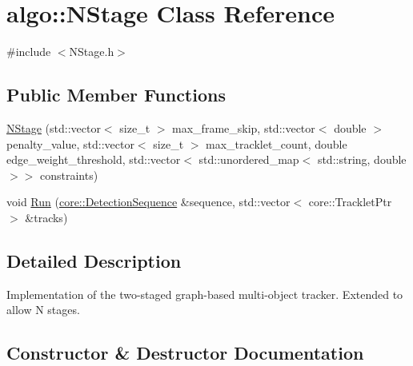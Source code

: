 \hypertarget{classalgo_1_1NStage}{}\section{algo\+:\+:N\+Stage Class Reference}
\label{classalgo_1_1NStage}


{\ttfamily \#include $<$N\+Stage.\+h$>$}

\subsection*{Public Member Functions}
\begin{DoxyCompactItemize}
\item 
\hyperlink{classalgo_1_1NStage_a3fd89ae32d8723b4fcd650be280a9c7c}{N\+Stage} (std\+::vector$<$ size\+\_\+t $>$ max\+\_\+frame\+\_\+skip, std\+::vector$<$ double $>$ penalty\+\_\+value, std\+::vector$<$ size\+\_\+t $>$ max\+\_\+tracklet\+\_\+count, double edge\+\_\+weight\+\_\+threshold, std\+::vector$<$ std\+::unordered\+\_\+map$<$ std\+::string, double $>$$>$ constraints)
\item 
void \hyperlink{classalgo_1_1NStage_a8c25c9c9796db048bb4b55d7a603b00b}{Run} (\hyperlink{classcore_1_1DetectionSequence}{core\+::\+Detection\+Sequence} \&sequence, std\+::vector$<$ core\+::\+Tracklet\+Ptr $>$ \&tracks)
\end{DoxyCompactItemize}


\subsection{Detailed Description}
Implementation of the two-\/staged graph-\/based multi-\/object tracker. Extended to allow N stages. 

\subsection{Constructor \& Destructor Documentation}
